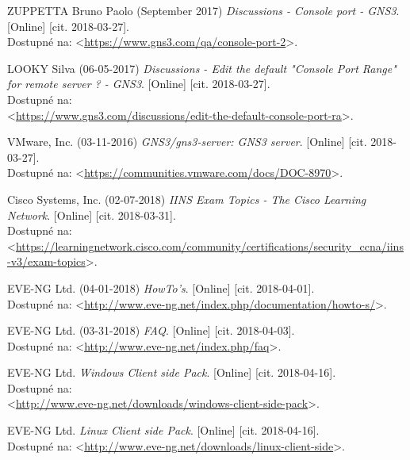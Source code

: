 \begin{thebibliography}{99}
ZUPPETTA Bruno Paolo (September 2017) {\it Discussions - Console port - GNS3}. [Online] [cit. 2018-03-27]. \\
Dostupné na: <\url{https://www.gns3.com/qa/console-port-2}>.

LOOKY Silva (06-05-2017) {\it Discussions - Edit the default "Console Port Range" for remote server ? - GNS3}. [Online] [cit. 2018-03-27]. \\
Dostupné na: \\
<\url{https://www.gns3.com/discussions/edit-the-default-console-port-ra}>.

VMware, Inc. (03-11-2016) {\it GNS3/gns3-server: GNS3 server}. [Online] [cit. 2018-03-27]. \\
Dostupné na: <\url{https://communities.vmware.com/docs/DOC-8970}>.

Cisco Systems, Inc. (02-07-2018) {\it IINS Exam Topics - The Cisco Learning Network}. [Online] [cit. 2018-03-31]. \\
Dostupné na: \\
<\url{https://learningnetwork.cisco.com/community/certifications/security_ccna/iins-v3/exam-topics}>.

EVE-NG Ltd. (04-01-2018) {\it HowTo's}. [Online] [cit. 2018-04-01]. \\
Dostupné na: <\url{http://www.eve-ng.net/index.php/documentation/howto-s/}>.

EVE-NG Ltd. (03-31-2018) {\it FAQ}. [Online] [cit. 2018-04-03]. \\
Dostupné na: <\url{http://www.eve-ng.net/index.php/faq}>.

EVE-NG Ltd. {\it Windows Client side Pack}. [Online] [cit. 2018-04-16]. \\
Dostupné na: \\
<\url{http://www.eve-ng.net/downloads/windows-client-side-pack}>.

EVE-NG Ltd. {\it Linux Client side Pack}. [Online] [cit. 2018-04-16]. \\
Dostupné na: <\url{http://www.eve-ng.net/downloads/linux-client-side}>.

\end{thebibliography}

